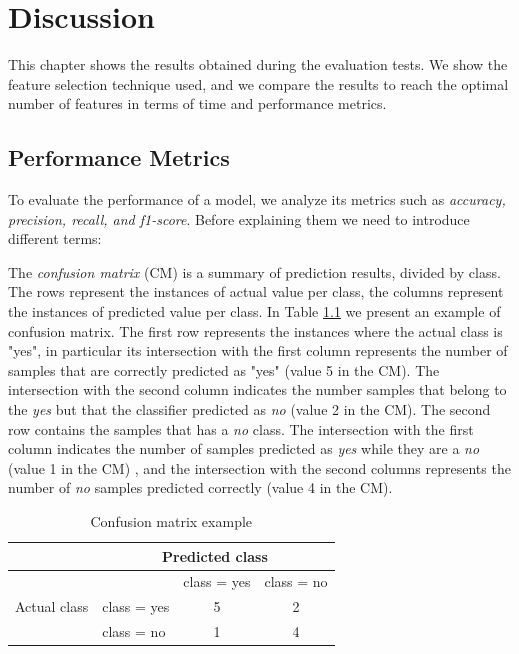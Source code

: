 \chapter{Discussion}
\label{ch:disc}

This chapter shows the results obtained during the evaluation tests. We show the feature selection technique used, and we compare the results to reach the optimal number of features in terms of time and performance metrics.

\section{Performance Metrics}

To evaluate the performance of a model, we analyze its metrics such as \textit{accuracy, precision, recall, and f1-score}. Before explaining them we need to introduce different terms:

The \textit{confusion matrix} (CM) is a summary of prediction results, divided by class. The rows represent the instances of actual value per class, the columns represent the instances of predicted value per class. In Table \ref{tab:cm} we present an example of confusion matrix. The first row represents the instances where the actual class is "yes", in particular its intersection with the first column represents the number of samples that are correctly predicted as "yes" (value 5 in the CM). The intersection with the second
column indicates the number samples that belong to the \textit{yes} but that the classifier predicted as \textit{no} (value 2 in the CM). The second row contains the samples that has a \textit{no} class. The intersection with the first column indicates the number of samples predicted as \textit{yes} while they are a \textit{no} (value 1 in the CM) , and the intersection with the second columns represents the number of \textit{no} samples predicted correctly (value 4 in the CM).
\begin{table}[h]
	\centering
	\caption{Confusion matrix example}
	\label{tab:cm}
	\begin{tabular}{|l|l|c|c|}
		\hline
		& \multicolumn{3}{c|}{Predicted class}                                             \\ \hline
		\multirow{3}{*}{Actual class} &             & \multicolumn{1}{l|}{class = yes} & \multicolumn{1}{l|}{class = no} \\ \cline{2-4} 
		& class = yes & 5                                & 2                               \\ \cline{2-4} 
		& class = no  & 1                                & 4                               \\ \hline
	\end{tabular}
\end{table}


